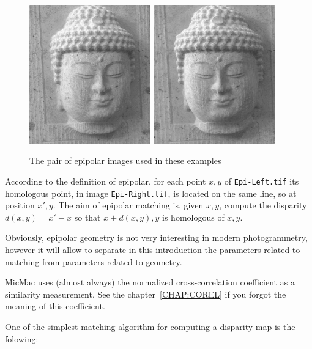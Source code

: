 \begin{figure}
\hspace{10 mm}
\includegraphics[height=60mm]{FIGS/Boudhas/Epi-Left.jpg}
\hspace{10 mm}
\includegraphics[height=60mm]{FIGS/Boudhas/Epi-Right.jpg}
\caption{The pair of epipolar images used in these examples}
\label{FIG:EPIP}
\end{figure}


According to the definition of epipolar, for each point $x,y$ of {\tt Epi-Left.tif} its
homologous point, in  image {\tt Epi-Right.tif}, is located on the same line, so at
position $x',y$.  The aim of epipolar matching is, given $x,y$,  compute the
disparity $d(x,y)=x'-x$ so that $x+d(x,y),y$ is homologous of  $x,y$.

Obviously, epipolar geometry is not very interesting in modern
photogrammetry, however it will allow to separate in this introduction the
parameters related to  matching  from parameters related to geometry.



MicMac uses (almost always) the normalized cross-correlation coefficient
as a similarity measurement. See the chapter~\ref{CHAP:COREL} if you
forgot the meaning of this coefficient.

One of the simplest matching algorithm for computing a disparity map is
the folowing:

